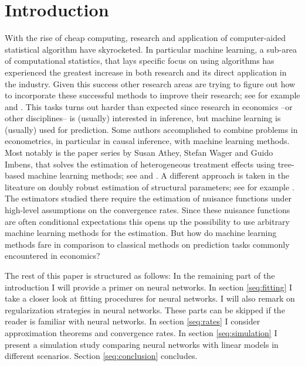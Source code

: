 \section{Introduction}
\label{seq:introduction}

With the rise of cheap computing, research and application of computer-aided statistical
algorithm have skyrocketed. In particular machine learning, a sub-area of computational
statistics, that lays specific focus on using algorithms has experienced the greatest
increase in both research and its direct application in the industry. Given this success
other research areas are trying to figure out how to incorporate these successful
methods to improve their research; see for example \cite{Varian.2014} and
\cite{Athey.2019}. This tasks turns out harder than expected since research in economics
--or other disciplines-- is (usually) interested in inference, but machine learning is
(usually) used for prediction. Some authors accomplished to combine problems in
econometrics, in particular in causal inference, with machine learning methods. Most
notably is the paper series by Susan Athey, Stefan Wager and Guido Imbens, that solves
the estimation of heterogeneous treatment effects using tree-based machine learning
methods; see \cite{Athey.2016} and \cite{Athey.2018}. A different approach is taken in
the liteature on doubly robust estimation of structural parameters; see for example
\cite{Chernozhukov.2018}. The estimators studied there require the estimation of
nuisance functions under high-level assumptions on the convergence rates. Since these
nuisance functions are often conditional expectations this opens up the possibility to
use arbitrary machine learning methods for the estimation. But how do machine learning
methods fare in comparison to classical methods on prediction tasks commonly encountered
in economics?

The rest of this paper is structured as follows: In the remaining part of the
introduction I will provide a primer on neural networks. In section \ref{seq:fitting} I
take a closer look at fitting procedures for neural networks. I will also remark on
regularization strategies in neural networks. These parts can be skipped if the reader
is familiar with neural networks. In section \ref{seq:rates} I consider approximation
theorems and convergence rates. In section \ref{seq:simulation} I present a simulation
study comparing neural networks with linear models in different scenarios. Section
\ref{seq:conclusion} concludes.


